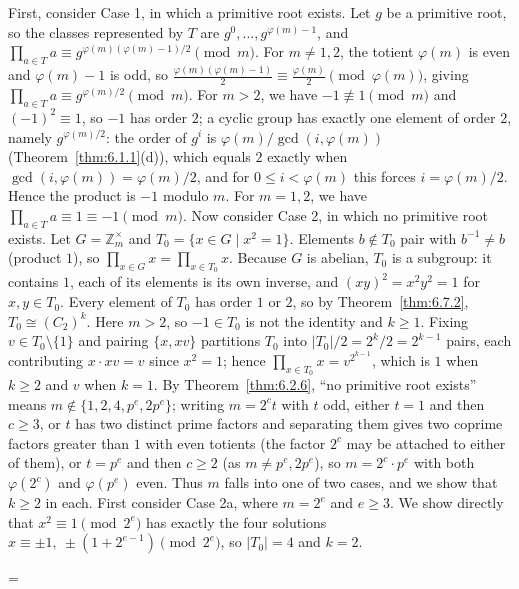 \documentclass[11pt]{article}
\makeatletter
\theoremstyle{ntstyle}
\let\nt@closedisplay\]
\def\nt@guardedclose{\@ifnextchar\par{\nt@closeafterpar}{\@ifnextchar\end{\postdisplaypenalty\@M\nt@closedisplay}{\nt@closedisplay}}}
\def\nt@closeafterpar\par{\@ifnextchar\par{\nt@closeafterpar}{\@ifnextchar\end{\postdisplaypenalty\@M\nt@closedisplay\par}{\nt@closedisplay\par}}}
\renewenvironment{proof}[1][\proofname]{\par
  \pushQED{\qed}\normalfont\topsep\medskipamount\edef\nt@afterproof{\@endparpenalty=\the\@endparpenalty\relax}\@beginparpenalty\@M\@endparpenalty\@M\let\]\nt@guardedclose\trivlist\item[]\textit{#1\@addpunct{.}} \ignorespaces}{\ifvmode\addpenalty\@M\fi\popQED\nt@afterproof\endtrivlist\@endpefalse}
\newcommand{\ZmodUnits}[1]{\mathbb{Z}_{#1}^{\times}}
\makeatother
\begin{document}
\begin{proof} First, consider Case 1, in which a primitive root exists.
	Let $g$ be a primitive root, so the classes represented by $T$ are $g^{0}, \ldots,
		g^{\varphi(m)-1}$, and $\prod_{a \in T} a \equiv
		g^{\varphi(m)(\varphi(m)-1)/2} \pmod{m}$. For $m \neq 1, 2$,
	the totient $\varphi(m)$ is even and $\varphi(m)-1$ is odd, so
	$\frac{\varphi(m)(\varphi(m)-1)}{2} \equiv \frac{\varphi(m)}{2}
		\pmod{\varphi(m)}$, giving $\prod_{a \in T}a\equiv g^{\varphi(m)/2}\pmod{m}$.
		  For $m>2$, we have $-1\not\equiv1\pmod{m}$ and $(-1)^2\equiv1$, so $-1$ has order $2$; a cyclic group has exactly one element of order $2$, namely $g^{\varphi(m)/2}$:
		  the order of $g^{i}$ is $\varphi(m)/\gcd(i,\varphi(m))$ (Theorem~\ref{thm:6.1.1}(d)), which equals $2$ exactly when $\gcd(i,\varphi(m))=\varphi(m)/2$, and for $0\le i<\varphi(m)$ this forces $i=\varphi(m)/2$.
		  Hence the product is $-1$ modulo $m$.
		  For $m = 1, 2$,
	we have $\prod_{a \in T} a \equiv 1 \equiv -1 \pmod{m}$. Now consider Case 2, in which no
	primitive root exists. Let $G = \ZmodUnits{m}$ and $T_0 = \{x \in
		G \mid x^{2} = 1\}$. Elements $b \notin T_0$ pair with $b^{-1} \neq b$
	(product $1$), so $\prod_{x \in G} x = \prod_{x \in T_0} x$. Because $G$
	is abelian, $T_0$ is a subgroup: it contains $1$, each of its elements is
	its own inverse, and $(xy)^2=x^2y^2=1$ for $x,y\in T_0$. Every element
	of $T_0$ has order $1$ or $2$, so by
	Theorem~\ref{thm:6.7.2}, $T_0 \cong (C_2)^{k}$. Here $m>2$, so $-1\in T_0$ is not the identity and $k\ge1$. Fixing $v \in T_0 \setminus
		\{1\}$ and pairing $\{x, xv\}$ partitions $T_0$ into
		$|T_0|/2 = 2^{k}/2 = 2^{k-1}$ pairs, each contributing
	$x\cdot xv = v$ since $x^{2} = 1$; hence $\prod_{x \in T_0} x =
		v^{2^{k-1}}$, which is $1$ when $k \ge 2$ and $v$ when $k = 1$. By
	Theorem~\ref{thm:6.2.6}, ``no primitive root exists'' means $m \notin \{1, 2,
		4, p^{e}, 2p^{e}\}$; writing $m = 2^{c} t$ with $t$ odd, either $t = 1$
	and then $c \ge 3$, or $t$ has two distinct prime factors and
	separating them gives two coprime factors greater than $1$ with even totients
	(the factor $2^{c}$ may be attached to either of them), or $t = p^{e}$ and then $c \ge 2$
	(as $m \neq p^{e}, 2p^{e}$), so $m = 2^{c} \cdot p^{e}$ with both
	$\varphi(2^{c})$ and $\varphi(p^{e})$ even. Thus $m$ falls into one of
	two cases, and we show that $k \ge 2$ in each. First consider Case 2a, where $m = 2^{e}$ and $e \ge 3$. We show directly that $x^{2}
		\equiv 1 \pmod{2^{e}}$ has exactly the four solutions $x \equiv \pm
			1,\ \pm(1 + 2^{e-1}) \pmod{2^{e}}$, so $|T_0| = 4$ and $k = 2$.

\end{proof}
\end{document}
